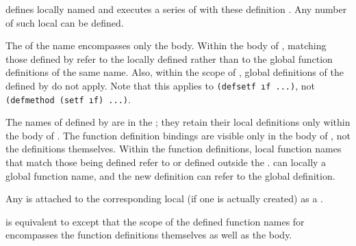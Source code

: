 \beginlist
{}

 defines locally named  and executes a series of
 with these definition .  Any number of
such local  can be defined.  

The  of the name  encompasses only the body.
Within the
body of , 
 matching those defined
by  
refer to the locally defined  
rather than to
the global function definitions of the same name.
Also, within the scope of , 
global  definitions of the 
defined by  do not apply. 
Note that this applies to 
{\tt (defsetf \i{f} ...)}, not
{\tt (defmethod (setf \i{f}) ...)}.

The names of  defined by  
are in the ; they retain
their local definitions only within the body of .
The function definition bindings are visible only in
the body of , not the definitions themselves.  Within the
function definitions, local function names
that match those being
defined refer to  or 
 defined outside the .
 can locally  a global function name,
and the new definition can refer to the global definition.

Any  is attached to the corresponding local 
(if one is actually created) as a .


 is equivalent to  except that
the scope of the defined function names for  
encompasses the function definitions themselves as well as the body.

